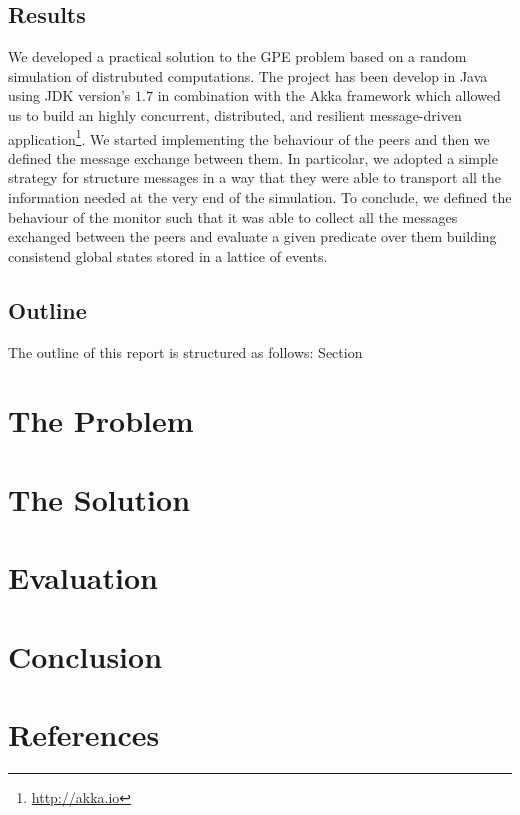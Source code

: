 \documentclass[12pt]{article}
\begin{document}
\subsection*{Results}

We developed a practical solution to the GPE problem based on a random simulation of distrubuted computations. The project has been develop in Java using JDK version's $1.7$ in combination with the Akka framework which allowed us to build an highly concurrent, distributed, and resilient message-driven application\footnote{\url{http://akka.io}}. We started implementing the behaviour of the peers and then we defined the message exchange between them. In particolar, we adopted a simple strategy for structure messages in a way that they were able to transport all the information needed at the very end of the simulation. To conclude, we defined the behaviour of the monitor such that it was able to collect all the messages exchanged between the peers and evaluate a given predicate over them building consistend global states stored in a lattice of events.


\subsection*{Outline}

The outline of this report is structured as follows: Section

\section{The Problem}

\section{The Solution}

\section{Evaluation}

\section{Conclusion}

\section{References}
\end{document}

